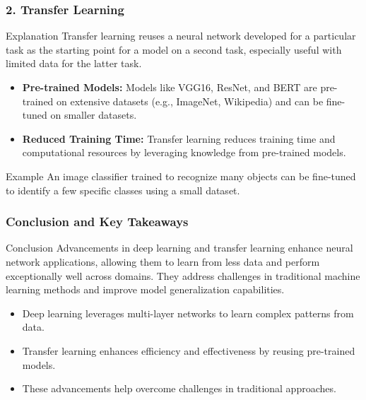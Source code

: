 \documentclass[aspectratio=169]{beamer}
\begin{document}
\begin{frame}[fragile]
    \frametitle{2. Transfer Learning}
    \begin{block}{Explanation}
        Transfer learning reuses a neural network developed for a particular task as the starting point for a model on a second task, especially useful with limited data for the latter task.
    \end{block}
    
    \begin{itemize}
        \item \textbf{Pre-trained Models:} Models like VGG16, ResNet, and BERT are pre-trained on extensive datasets (e.g., ImageNet, Wikipedia) and can be fine-tuned on smaller datasets.
        \item \textbf{Reduced Training Time:} Transfer learning reduces training time and computational resources by leveraging knowledge from pre-trained models.
    \end{itemize}
    
    \begin{block}{Example}
        An image classifier trained to recognize many objects can be fine-tuned to identify a few specific classes using a small dataset.
    \end{block}
\end{frame}

\begin{frame}[fragile]
    \frametitle{Conclusion and Key Takeaways}
    \begin{block}{Conclusion}
        Advancements in deep learning and transfer learning enhance neural network applications, allowing them to learn from less data and perform exceptionally well across domains. They address challenges in traditional machine learning methods and improve model generalization capabilities.
    \end{block}
    
    \begin{itemize}
        \item Deep learning leverages multi-layer networks to learn complex patterns from data.
        \item Transfer learning enhances efficiency and effectiveness by reusing pre-trained models.
        \item These advancements help overcome challenges in traditional approaches.
    \end{itemize}
\end{frame}
\end{document}
